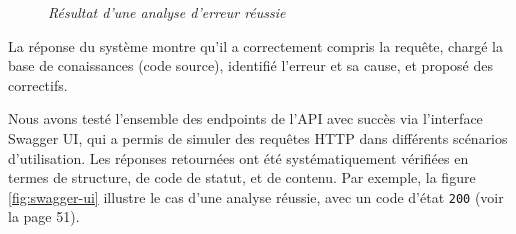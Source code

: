 \documentclass[12pt,a4paper]{report}
\begin{document}
	\begin{figure}[H]
		\centering
		\caption{\textit{Résultat d'une analyse d'erreur réussie}}
		\label{fig:premier-test}
	\end{figure}
	
	La réponse du système montre qu'il a correctement compris la requête, chargé la base de conaissances (code source), identifié l'erreur et sa cause, et proposé des correctifs. 
	
	Nous avons testé l'ensemble des endpoints de l'API avec succès via l'interface Swagger UI, qui a permis de simuler des requêtes HTTP dans différents scénarios d'utilisation. Les réponses retournées ont été systématiquement vérifiées en termes de structure, de code de statut, et de contenu. Par exemple, la figure \ref{fig:swagger-ui} illustre le cas d'une analyse réussie, avec un code d'état \verb|200| (voir la page 51).
	
\end{document}
